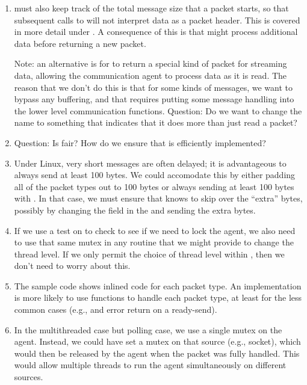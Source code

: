 \begin{enumerate}
\item {} must also keep track of the total message size that
  a packet starts, so that subsequent calls to  will not
  interpret data as a packet header.  This is covered in more detail under
  .  A consequence of this is that
   might process additional data before returning a new
  packet.

  Note: an alternative is for  to return a special
  kind of packet for streaming data, allowing the communication agent to
  process data as it is read.  The reason that we don't do this is that for
  some kinds of messages, we want to bypass any buffering, and that requires
  putting some message handling into the lower level communication functions.
  Question: Do we want to change the name to something that indicates that it
  does more than just read a packet?

\item Question: Is  fair?  How do we ensure that
   is efficiently implemented?

\item Under Linux, very short messages are often delayed; it is advantageous
  to always send at least 100 bytes.  We could accomodate this by either
  padding all of the packet types out to 100 bytes or always sending at least
  100 bytes with .  In that case, we must ensure that
   knows to skip over the ``extra'' bytes, possibly by
  changing the  field in the  and sending the extra
  bytes.  

\item If we use a test on  to check to see if we
  need to lock the agent, we also need to use that same mutex in any routine
  that we might provide to change the thread level.  If we only permit the
  choice of thread level within , then we don't need
  to worry about this.

\item The sample code shows inlined code for each packet type.  An
  implementation is more likely to use functions to handle each packet type,
  at least for the less common cases (e.g.,  and
  error return on a ready-send).

\item In the multithreaded case but polling case, we use a single mutex on the
  agent.  Instead, we could have  set a mutex on that
  source (e.g., socket), which would then be released by the agent when the
  packet was fully handled.  This would allow multiple threads to run the
  agent simultaneously on different sources.
\end{enumerate}

